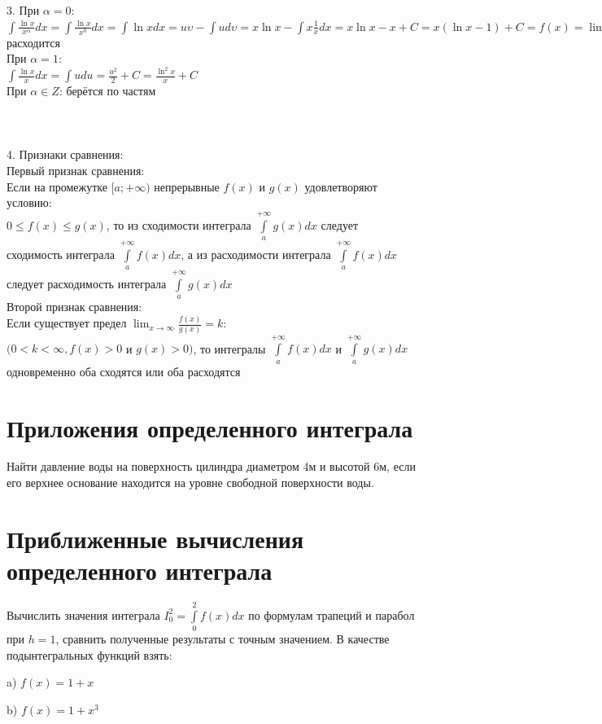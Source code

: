 \documentclass{article}
\begin{document}
3. При $ \alpha = 0 $:\\
\large
$ \int\limits \frac{\ln{x}}{x^{\alpha}}dx = \int\limits \frac{\ln{x}}{x^0}dx = \int\limits \ln{x}dx = u\upsilon - \int\limits ud\upsilon = x\ln{x} - \int\limits x\frac{1}{x}dx = x\ln{x} - x + C = x(\ln{x} - 1) + C = f(x) = \lim_{x\to \infty} f(x) = \infty => $ расходится\\
\normalsize
При $ \alpha = 1 $:\\
\large
$ \int\limits \frac{\ln{x}}{x}dx = \int\limits udu = \frac{u^2}{2} + C = \frac{\ln^2{x}}{x} + C $\\
\normalsize
При $ \alpha \in Z $: берётся по частям\\\\\\\\
4. Признаки сравнения:\\
Первый признак сравнения:\\
Если на промежутке $ [a; +\infty) $ непрерывные $ f(x) $ и $ g(x) $ удовлетворяют условию:\\
$ 0 \le f(x) \le g(x) $, то из сходимости интеграла $ \int\limits^{+\infty}_{a} g(x)dx $ следует сходимость интеграла $ \int\limits^{+\infty}_{a} f(x)dx $, а из расходимости интеграла $ \int\limits^{+\infty}_{a} f(x)dx $ следует расходимость интеграла $ \int\limits^{+\infty}_{a} g(x)dx $\\
Второй признак сравнения:\\
Если существует предел $ \lim_{x\to \infty} \frac{f(x)}{g(x)} = k $:\\
$ (0 < k < \infty, f(x) > 0 $ и $ g(x) > 0) $, то интегралы $ \int\limits^{+\infty}_{a} f(x)dx $ и $ \int\limits^{+\infty}_{a} g(x)dx $ одновременно оба сходятся или оба расходятся
\Large
\section{Приложения определенного интеграла}
\normalsize
Найти давление воды на поверхность цилиндра диаметром 4м и высотой 6м, если его верхнее основание находится на уровне свободной поверхности воды.
\Large
\section{Приближенные вычисления определенного интеграла}
\normalsize
Вычислить значения интеграла $ I^2_0 = \int\limits^2_0 f(x)dx $ по формулам трапеций и парабол при $ h = 1 $, сравнить полученные результаты с точным значением. В качестве подынтегральных функций взять:

a) $ f(x) = 1 + x $

b) $ f(x) = 1 + x^3 $
\end{document}
